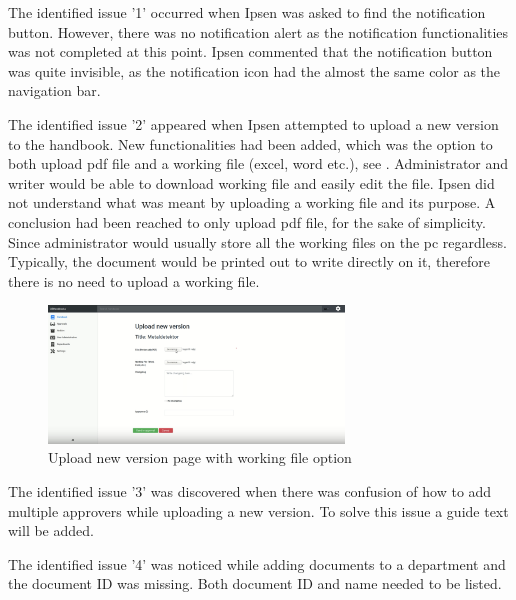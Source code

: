 The identified issue '1' occurred when Ipsen was asked to find the notification button. 
However, there was no notification alert as the notification functionalities was not completed at this point.
Ipsen commented that the notification button was quite invisible, as the notification icon had the almost the same color as the navigation bar.

The identified issue '2' appeared when Ipsen attempted to upload a new version to the handbook.
New functionalities had been added, which was the option to both upload pdf file and a working file (excel, word etc.), see .
Administrator and writer would be able to download working file and easily edit the file.
Ipsen did not understand what was meant by uploading a working file and its purpose.
A conclusion had been reached to only upload pdf file, for the sake of simplicity.
Since administrator would usually store all the working files on the pc regardless.
Typically, the document would be printed out to write directly on it, therefore there is no need to upload a working file.

\begin{figure}[H]
	\centering
		\includegraphics[width=0.7\textwidth]{billeder/WorkingFile.png}
	\caption{Upload new version page with working file option}\label{fig:WorkingFile}
\end{figure}

The identified issue '3' was discovered when there was confusion of how to add multiple approvers while uploading a new version.
To solve this issue a guide text will be added.

The identified issue '4' was noticed while adding documents to a department and the document ID was missing.
Both document ID and name needed to be listed.

